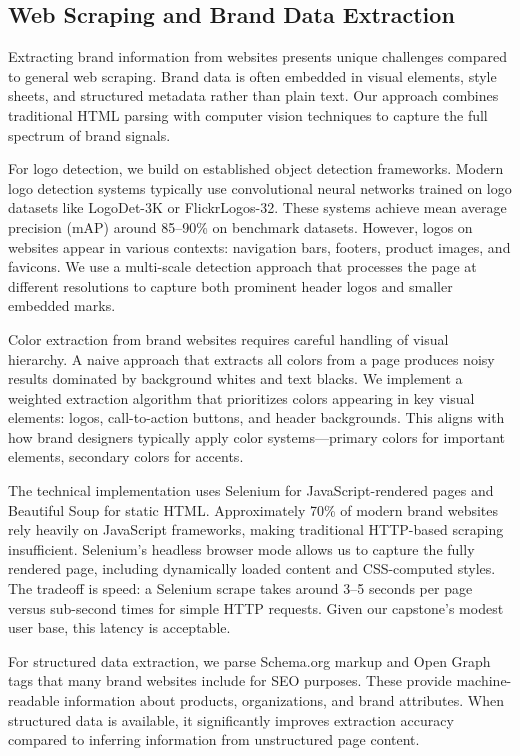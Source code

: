\documentclass[11pt, twocolumn]{article}
\begin{document}
\subsection{Web Scraping and Brand Data Extraction}

Extracting brand information from websites presents unique challenges compared to general web scraping. Brand data is often embedded in visual elements, style sheets, and structured metadata rather than plain text. Our approach combines traditional HTML parsing with computer vision techniques to capture the full spectrum of brand signals.

For logo detection, we build on established object detection frameworks. Modern logo detection systems typically use convolutional neural networks trained on logo datasets like LogoDet-3K or FlickrLogos-32. These systems achieve mean average precision (mAP) around 85--90\% on benchmark datasets. However, logos on websites appear in various contexts: navigation bars, footers, product images, and favicons. We use a multi-scale detection approach that processes the page at different resolutions to capture both prominent header logos and smaller embedded marks.

Color extraction from brand websites requires careful handling of visual hierarchy. A naive approach that extracts all colors from a page produces noisy results dominated by background whites and text blacks. We implement a weighted extraction algorithm that prioritizes colors appearing in key visual elements: logos, call-to-action buttons, and header backgrounds. This aligns with how brand designers typically apply color systems---primary colors for important elements, secondary colors for accents.

The technical implementation uses Selenium for JavaScript-rendered pages and Beautiful Soup for static HTML. Approximately 70\% of modern brand websites rely heavily on JavaScript frameworks, making traditional HTTP-based scraping insufficient. Selenium's headless browser mode allows us to capture the fully rendered page, including dynamically loaded content and CSS-computed styles. The tradeoff is speed: a Selenium scrape takes around 3--5 seconds per page versus sub-second times for simple HTTP requests. Given our capstone's modest user base, this latency is acceptable.

For structured data extraction, we parse Schema.org markup and Open Graph tags that many brand websites include for SEO purposes. These provide machine-readable information about products, organizations, and brand attributes. When structured data is available, it significantly improves extraction accuracy compared to inferring information from unstructured page content.
\end{document}
